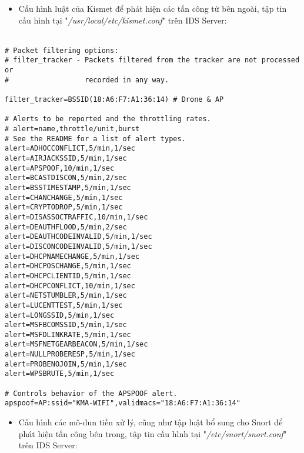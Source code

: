 \begin{itemize}
\item Cấu hình luật của Kismet để phát hiện các tấn công từ bên ngoài, tập tin cấu hình tại "\emph{/usr/local/etc/kismet.conf}" trên IDS Server:\\ \\
\end{itemize}

\begin{lstlisting}
# Packet filtering options:
# filter_tracker - Packets filtered from the tracker are not processed or
#                  recorded in any way.

filter_tracker=BSSID(18:A6:F7:A1:36:14) # Drone & AP

# Alerts to be reported and the throttling rates.
# alert=name,throttle/unit,burst
# See the README for a list of alert types.
alert=ADHOCCONFLICT,5/min,1/sec
alert=AIRJACKSSID,5/min,1/sec
alert=APSPOOF,10/min,1/sec
alert=BCASTDISCON,5/min,2/sec
alert=BSSTIMESTAMP,5/min,1/sec
alert=CHANCHANGE,5/min,1/sec
alert=CRYPTODROP,5/min,1/sec
alert=DISASSOCTRAFFIC,10/min,1/sec
alert=DEAUTHFLOOD,5/min,2/sec
alert=DEAUTHCODEINVALID,5/min,1/sec
alert=DISCONCODEINVALID,5/min,1/sec
alert=DHCPNAMECHANGE,5/min,1/sec
alert=DHCPOSCHANGE,5/min,1/sec
alert=DHCPCLIENTID,5/min,1/sec
alert=DHCPCONFLICT,10/min,1/sec
alert=NETSTUMBLER,5/min,1/sec
alert=LUCENTTEST,5/min,1/sec
alert=LONGSSID,5/min,1/sec
alert=MSFBCOMSSID,5/min,1/sec
alert=MSFDLINKRATE,5/min,1/sec
alert=MSFNETGEARBEACON,5/min,1/sec
alert=NULLPROBERESP,5/min,1/sec
alert=PROBENOJOIN,5/min,1/sec
alert=WPSBRUTE,5/min,1/sec

# Controls behavior of the APSPOOF alert.
apspoof=AP:ssid="KMA-WIFI",validmacs="18:A6:F7:A1:36:14"
\end{lstlisting}

\headsep=14pt

\begin{itemize}
\item Cấu hình các mô-đun tiền xử lý, cũng như tập luật bổ sung cho Snort để phát hiện tấn công bên trong, tập tin cấu hình tại "\emph{/etc/snort/snort.conf}" trên IDS Server:\\
\end{itemize}

